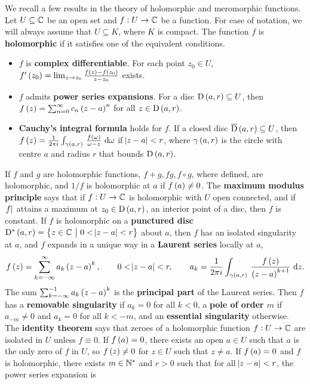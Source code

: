 We recall a few results in the theory of holomorphic and meromorphic functions. Let $ U \subseteq \mathbb{C} $ be an open set and $ f : U \to \mathbb{C} $ be a function. For ease of notation, we will always assume that $ U \subseteq K $, where $ K $ is compact. The function $ f $ is \textbf{holomorphic} if it satisfies one of the equivalent conditions.
\begin{itemize}
\item $ f $ is \textbf{complex differentiable}. For each point $ z_0 \in U $, $ f'\br{z_0} = \lim_{z \to z_0} \tfrac{f\br{z} - f\br{z_0}}{z - z_0} $ exists.
\item $ f $ admits \textbf{power series expansions}. For a disc $ \D\br{a, r} \subseteq U $, then $ f\br{z} = \sum_{n = 0}^\infty c_n\br{z - a}^n $ for all $ z \in \D\br{a, r} $.
\item \textbf{Cauchy's integral formula} holds for $ f $. If a closed disc $ \overline{\D}\br{a, r} \subseteq U $, then $ f\br{z} = \tfrac{1}{2\pi i}\intd{\gamma\br{a, r}}{}{\tfrac{f\br{\omega}}{\omega - z}}{\omega} $ if $ \abs{z - a} < r $, where $ \gamma\br{a, r} $ is the circle with centre $ a $ and radius $ r $ that bounds $ \D\br{a, r} $.
\end{itemize}
If $ f $ and $ g $ are holomorphic functions, $ f + g, fg, f \circ g $, where defined, are holomorphic, and $ 1 / f $ is holomorphic at $ a $ if $ f\br{a} \ne 0 $. The \textbf{maximum modulus principle} says that if $ f : U \to \mathbb{C} $ is holomorphic with $ U $ open connected, and if $ \abs{f} $ attains a maximum at $ z_0 \in \D\br{a, r} $, an interior point of a disc, then $ f $ is constant. If $ f $ is holomorphic on a \textbf{punctured disc} $ \D^*\br{a, r} = \cbr{z \in \CC \st 0 < \abs{z - a} < r} $ about $ a $, then $ f $ has an isolated singularity at $ a $, and $ f $ expands in a unique way in a \textbf{Laurent series} locally at $ a $,
$$ f\br{z} = \sum_{k = -\infty}^\infty a_k\br{z - a}^k, \qquad 0 < \abs{z - a} < r, \qquad a_k = \dfrac{1}{2\pi i} \intd{\gamma\br{a, r}}{}{\dfrac{f\br{z}}{\br{z - a}^{k + 1}}}{z}. $$
The sum $ \sum_{k = -\infty}^{-1} a_k\br{z - a}^k $ is the \textbf{principal part} of the Laurent series. Then $ f $ has a \textbf{removable singularity} if $ a_k = 0 $ for all $ k < 0 $, a \textbf{pole of order $ m $} if $ a_{-m} \ne 0 $ and $ a_k = 0 $ for all $ k < -m $, and an \textbf{essential singularity} otherwise. The \textbf{identity theorem} says that zeroes of a holomorphic function $ f : U \to \mathbb{C} $ are isolated in $ U $ unless $ f \equiv 0 $. If $ f\br{a} = 0 $, there exists an open $ a \in U $ such that $ a $ is the only zero of $ f $ in $ U $, so $ f\br{z} \ne 0 $ for $ z \in U $ such that $ z \ne a $. If $ f\br{a} = 0 $ and $ f $ is holomorphic, there exists $ m \in \mathbb{N}^* $ and $ r > 0 $ such that for all $ \abs{z - a} < r $, the power series expansion is
